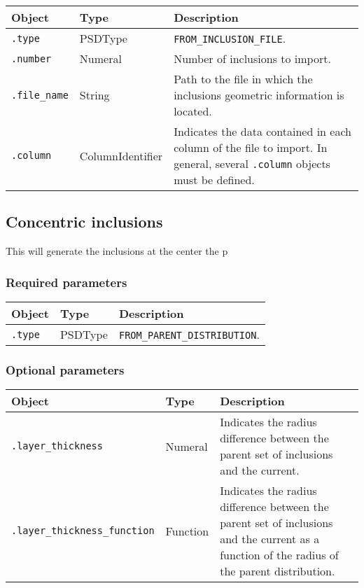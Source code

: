 \documentclass[10pt]{article}
\begin{document}
\begin{tabularx}{\textwidth}{llX}
\hline 
Object & Type & Description \\ 
\hline 
\verb+.type+ & PSDType & \verb+FROM_INCLUSION_FILE+. \\ 
\verb+.number+ & Numeral & Number of inclusions to import. \\ 
\verb+.file_name+ & String & Path to the file in which the inclusions geometric information is located.\\ 
\verb+.column+ & ColumnIdentifier & Indicates the data contained in each column of the file to import. In general, several \verb+.column+ objects must be defined. \\ 
\hline 
\end{tabularx}

\subsection{Concentric inclusions}

This will generate the inclusions at the center the p%

\subsubsection*{Required parameters}

\begin{tabularx}{\textwidth}{llX}
\hline 
Object & Type & Description \\ 
\hline 
\verb+.type+ & PSDType & \verb+FROM_PARENT_DISTRIBUTION+. \\ 
\hline 
\end{tabularx}

\subsubsection*{Optional parameters}

\begin{tabularx}{\textwidth}{llX}
\hline 
Object & Type & Description \\ 
\hline 
\verb+.layer_thickness+ & Numeral & Indicates the radius difference between the parent set of inclusions and the current. \\ 
\verb+.layer_thickness_function+ & Function & Indicates the radius difference between the parent set of inclusions and the current as a function of the radius of the parent distribution. \\ 
\hline 
\end{tabularx}
\end{document}
